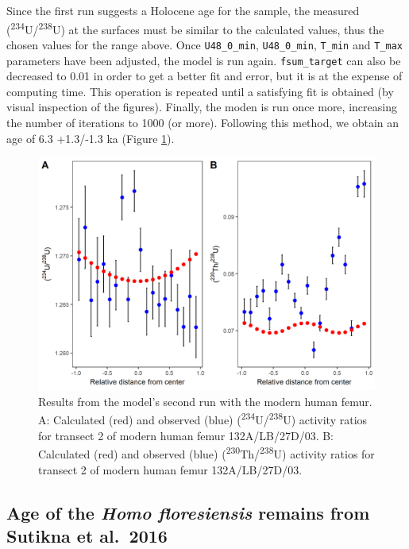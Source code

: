 \documentclass[]{elsarticle} %
\begin{document}
\FloatBarrier

Since the first run suggests a Holocene age for the sample, the measured (\textsuperscript{234}U/\textsuperscript{238}U) at the surfaces must be similar to the calculated values, thus the chosen values for the range above. Once \texttt{U48\_0\_min}, \texttt{U48\_0\_min}, \texttt{T\_min} and \texttt{T\_max} parameters have been adjusted, the model is run again. \texttt{fsum\_target} can also be decreased to 0.01 in order to get a better fit and error, but it is at the expense of computing time. This operation is repeated until a satisfying fit is obtained (by visual inspection of the figures). Finally, the moden is run once more, increasing the number of iterations to 1000 (or more). Following this method, we obtain an age of 6.3 +1.3/-1.3 ka (Figure \ref{fig:plot-panel-second-run-modern-fig}).



\begin{figure}
\includegraphics[width=1\linewidth]{figures/plot-panel-second-run-modern} \caption{Results from the model's second run with the modern human femur. A: Calculated (red) and observed (blue) (\textsuperscript{234}U/\textsuperscript{238}U) activity ratios for transect 2 of modern human femur 132A/LB/27D/03. B: Calculated (red) and observed (blue) (\textsuperscript{230}Th/\textsuperscript{238}U) activity ratios for transect 2 of modern human femur 132A/LB/27D/03.}\label{fig:plot-panel-second-run-modern-fig}
\end{figure}

\FloatBarrier

\hypertarget{age-of-the-homo-floresiensis-remains-from-sutikna-et-al.2016}{%
\subsection{\texorpdfstring{Age of the \emph{Homo floresiensis} remains from Sutikna et al.~2016}{Age of the Homo floresiensis remains from Sutikna et al.~2016}}\label{age-of-the-homo-floresiensis-remains-from-sutikna-et-al.2016}}
\end{document}
